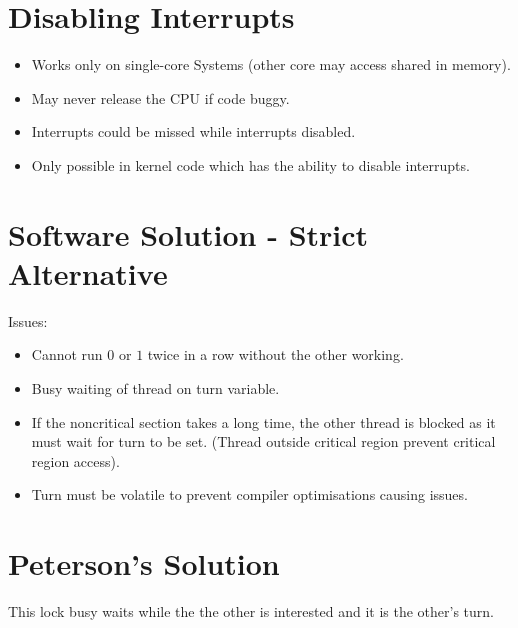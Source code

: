 \documentclass{report}
\begin{document}
\section*{Disabling Interrupts}
\begin{itemize}
	\item Works only on single-core Systems (other core may access shared in memory).
	\item May never release the CPU if code buggy.
	\item Interrupts could be missed while interrupts disabled.
	\item Only possible in kernel code which has the ability to disable interrupts.
\end{itemize}
\section*{Software Solution - Strict Alternative}
\begin{minipage}[t]{0.5\textwidth}
\end{minipage}
\begin{minipage}[t]{0.5\textwidth}
\end{minipage}
Issues:
\begin{itemize}
	\item Cannot run $0$ or $1$ twice in a row without the other working.
	\item Busy waiting of thread on turn variable.
	\item If the noncritical section takes a long time, the other thread is blocked as it must wait for turn to be set. (Thread outside critical region prevent critical region access).
	\item Turn must be volatile to prevent compiler optimisations causing issues.
\end{itemize}
\section*{Peterson's Solution}
\begin{minipage}[t]{0.7\textwidth}
\end{minipage}
\begin{minipage}[t]{0.3\textwidth}
\end{minipage}
This lock busy waits while the the other is interested and it is the other's turn.
\end{document}
